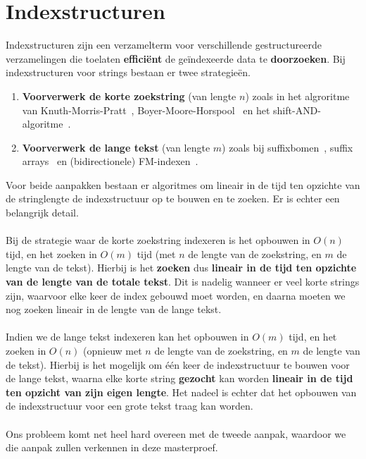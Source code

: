 \chapter{Indexstructuren}\label{ch:indexstructuren}
Indexstructuren zijn een verzamelterm voor verschillende gestructureerde verzamelingen die toelaten \textbf{efficiënt} de geïndexeerde data te \textbf{doorzoeken}.
Bij indexstructuren voor strings bestaan er twee strategieën.
\begin{enumerate}
    \item \textbf{Voorverwerk de korte zoekstring} (van lengte $n$) zoals in het algroritme van Knuth-Morris-Pratt~\cite{knuth-morris-pratt}, Boyer-Moore-Horspool~\cite{boyer-moore-horspool} en het shift-AND-algoritme~\cite{shift-and}.
    \item \textbf{Voorverwerk de lange tekst} (van lengte $m$) zoals bij suffixbomen~\cite{mcCreight_first_suffixtree}, suffix arrays~\cite{suffix_array_first_mention} en (bidirectionele) FM-indexen~\cite{fm_index, bi-directional_fm_index}.
\end{enumerate}
Voor beide aanpakken bestaan er algoritmes om lineair in de tijd ten opzichte van de stringlengte de indexstructuur op te bouwen en te zoeken.
Er is echter een belangrijk detail.
\\ \\
Bij de strategie waar de korte zoekstring indexeren is het opbouwen in $O(n)$ tijd, en het zoeken in $O(m)$ tijd (met $n$ de lengte van de zoekstring, en $m$ de lengte van de tekst).
Hierbij is het \textbf{zoeken} dus \textbf{lineair in de tijd ten opzichte van de lengte van de totale tekst}.
Dit is nadelig wanneer er veel korte strings zijn, waarvoor elke keer de index gebouwd moet worden, en daarna moeten we nog zoeken lineair in de lengte van de lange tekst.
\\ \\
Indien we de lange tekst indexeren kan het opbouwen in $O(m)$ tijd, en het zoeken in $O(n)$ (opnieuw met $n$ de lengte van de zoekstring, en $m$ de lengte van de tekst).
Hierbij is het mogelijk om één keer de indexstructuur te bouwen voor de lange tekst, waarna elke korte string \textbf{gezocht} kan worden \textbf{lineair in de tijd ten opzicht van zijn eigen lengte}.
Het nadeel is echter dat het opbouwen van de indexstructuur voor een grote tekst traag kan worden.
\\ \\
Ons probleem komt net heel hard overeen met de tweede aanpak, waardoor we die aanpak zullen verkennen in deze masterproef.
